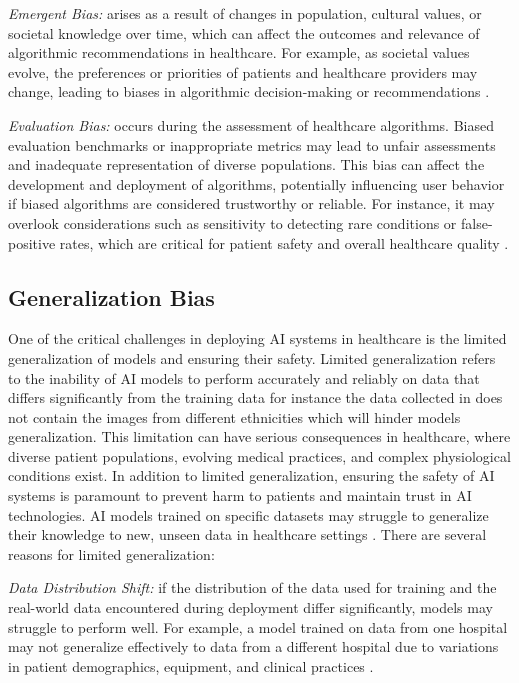 \documentclass{article}
\begin{document}
\emph{Emergent Bias:} arises as a result of changes in population, cultural values, or societal knowledge over time, which can affect the outcomes and relevance of algorithmic recommendations in healthcare. For example, as societal values evolve, the preferences or priorities of patients and healthcare providers may change, leading to biases in algorithmic decision-making or recommendations \cite{friedman1996bias}.

\emph{Evaluation Bias:} occurs during the assessment of healthcare algorithms. Biased evaluation benchmarks or inappropriate metrics may lead to unfair assessments and inadequate representation of diverse populations. This bias can affect the development and deployment of algorithms, potentially influencing user behavior if biased algorithms are considered trustworthy or reliable. For instance, it may overlook considerations such as sensitivity to detecting rare conditions or false-positive rates, which are critical for patient safety and overall healthcare quality \cite{suresh2021framework}.

\subsection{Generalization Bias}
One of the critical challenges in deploying AI systems in healthcare is the limited generalization of models and ensuring their safety. Limited generalization refers to the inability of AI models to perform accurately and reliably on data that differs significantly from the training data for instance the data collected in \cite{khan2019novel} does not contain the images from different ethnicities which will hinder models generalization. This limitation can have serious consequences in healthcare, where diverse patient populations, evolving medical practices, and complex physiological conditions exist. In addition to limited generalization, ensuring the safety of AI systems is paramount to prevent harm to patients and maintain trust in AI technologies. AI models trained on specific datasets may struggle to generalize their knowledge to new, unseen data in healthcare settings \cite{yang2020rethinking}. There are several reasons for limited generalization:

\emph{Data Distribution Shift:} if the distribution of the data used for training and the real-world data encountered during deployment differ significantly, models may struggle to perform well. For example, a model trained on data from one hospital may not generalize effectively to data from a different hospital due to variations in patient demographics, equipment, and clinical practices \cite{fang2020rethinking}.
\end{document}
